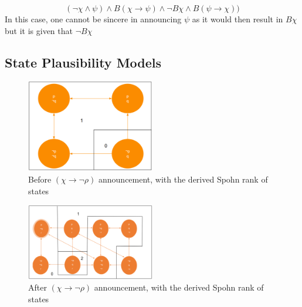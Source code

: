 \documentclass[12pt, titlepage, twoside, a4paper]{report}
\begin{document}
$$(\neg \chi \wedge \psi) \wedge B(\chi \to \psi) \wedge \neg B \chi \wedge B(\psi \to \chi))$$
In this case, one cannot be sincere in announcing $\psi$ as it would then result in $B\chi$ but it is given that $\neg B \chi$

\subsection{State Plausibility Models}
\quad
\newline
\begin{figure}[h!]
  \centering
  \includegraphics[width=0.5\textwidth]{slide34.eps}
  \caption{Before $(\chi \to \neg \rho)$ announcement, with the derived Spohn rank of states}
\end{figure}
\begin{figure}[h!]
  \centering
  \includegraphics[width=0.5\textwidth]{slide36.eps}
  \caption{After $(\chi \to \neg \rho)$ announcement, with the derived Spohn rank of states}
\end{figure}
\quad
\newline
\end{document}
